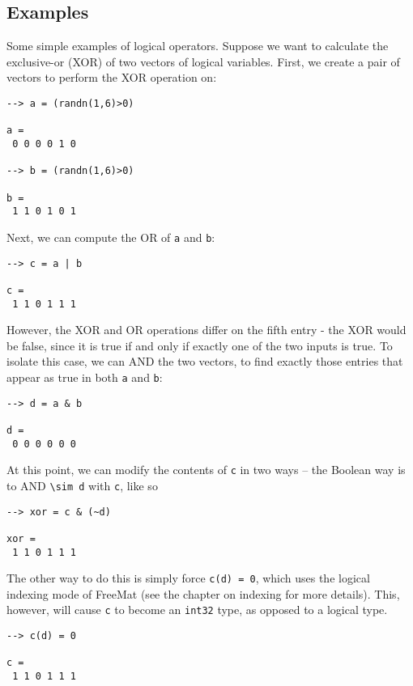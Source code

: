 \subsection{Examples}

Some simple examples of logical operators.  Suppose we want to calculate the exclusive-or (XOR) of two vectors of logical variables.  First, we create a pair of vectors to perform the XOR operation on:
\begin{verbatim}
--> a = (randn(1,6)>0)

a = 
 0 0 0 0 1 0 

--> b = (randn(1,6)>0)

b = 
 1 1 0 1 0 1 
\end{verbatim}
Next, we can compute the OR of \verb|a| and \verb|b|:
\begin{verbatim}
--> c = a | b

c = 
 1 1 0 1 1 1 
\end{verbatim}
However, the XOR and OR operations differ on the fifth entry - the XOR would be false, since it is true if and only if exactly one of the two inputs is true.  To isolate this case, we can AND the two vectors, to find exactly those entries that appear as true in both \verb|a| and \verb|b|:
\begin{verbatim}
--> d = a & b

d = 
 0 0 0 0 0 0 
\end{verbatim}
At this point, we can modify the contents of \verb|c| in two ways -- the Boolean way is to AND \verb|\sim d| with \verb|c|, like so
\begin{verbatim}
--> xor = c & (~d)

xor = 
 1 1 0 1 1 1 
\end{verbatim}
The other way to do this is simply force \verb|c(d) = 0|, which uses the logical indexing mode of FreeMat (see the chapter on indexing for more details).  This, however, will cause \verb|c| to become an \verb|int32| type, as opposed to a logical type.
\begin{verbatim}
--> c(d) = 0

c = 
 1 1 0 1 1 1 
\end{verbatim}

